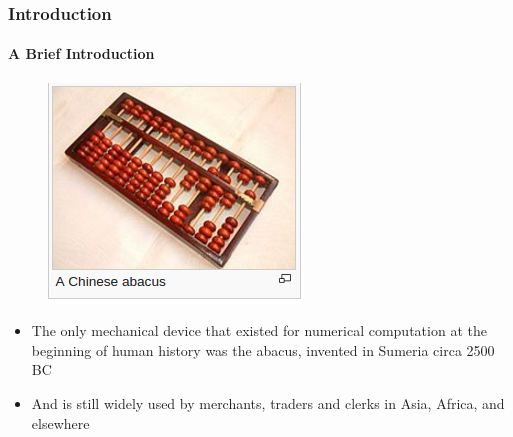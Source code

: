 \documentclass[hyperref={pdfpagelabels=true}]{beamer}
\begin{document}
\begin{frame}
\frametitle{Introduction}
\framesubtitle{A Brief Introduction}
\begin{figure}[!tbp]
\centering
\includegraphics[scale = 0.55]{figs/Selection_002.png}
\end{figure}
\begin{itemize}
\item[\ding{45}] The only mechanical device that existed for numerical computation at the beginning of human history was the abacus, invented in Sumeria circa 2500 BC
\item[\ding{45}] And is still widely used by merchants, traders and clerks in Asia, Africa, and elsewhere
\end{itemize}
\end{frame}
\end{document}

